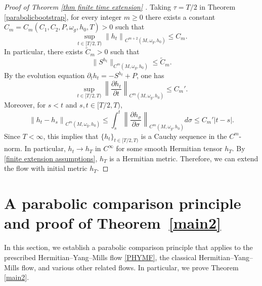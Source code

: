 \documentclass[12pt, reqno]{amsart}
\theoremstyle{plain}
\theoremstyle{definition}
\newcommand{\bproof}{\begin{proof}}
\newcommand{\eproof}{\end{proof}}
\newcommand{\p}{\partial}
\newcommand{\beq}{\begin{equation}}
\newcommand{\eeq}{\end{equation}}
\renewcommand{\tilde}{\widetilde}
\renewcommand{\>}{\rightarrow}
\renewcommand{\>}{\rightarrow}
\renewcommand{\p}{{\partial}}
\renewcommand{\tilde}{\widetilde}
\numberwithin{equation}{section} %
\begin{document}
\bproof[Proof of Theorem \ref{thm finite time extension} ]
Taking $\tau=T/2$ in Theorem \ref{parabolicbootstrap}, for every integer $m\geq0$ there exists a constant $C_m=C_m(C_1, C_2,  P, \omega_g, h_0, T)>0$ such that
\beq
\sup_{t\in[T/2,T)}\left\|h_t\right\|_{C^{m+2}(M,\omega_g, h_0)}\leq C_m.
\label{finite extension spatial estimates}
\eeq
In particular, there exists $\tilde C_m>0$ such that
\beq \|S^{h_t}\|_{C^{m}(M,\omega_g, h_0)}\leq \tilde C_m.\eeq
By the evolution equation $\partial_t h_t = -S^{h_t} + P$, one has
\beq
\sup_{t\in[T/2,T)}\left\|\frac{\p h_t}{\p t}\right\|_{C^m(M,\omega_g, h_0)}\leq C_m'.
\eeq
Moreover, for $s<t$ and $s,t\in[T/2,T)$,
\beq
\left\|h_t-h_s\right\|_{C^m(M,\omega_g, h_0)}
\leq\int_s^t\left\|\frac{\p h_\sigma}{\p\sigma}\right\|_{C^m(M,\omega_g, h_0)}d\sigma
\leq C_m'|t-s|.
\eeq
Since $T<\infty$, this implies that $\{h_t\}_{t\in[T/2,T)}$ is a Cauchy sequence in the $C^m$-norm. In particular,  $h_t\to h_T$ in $C^\infty$ for some smooth Hermitian tensor $h_T$.  By \eqref{finite extension assumptions}, $h_T$ is a Hermitian metric. Therefore, we can extend the flow with initial metric $h_T$.
\eproof


\baselineskip

    \section{A parabolic comparison principle and proof of Theorem~\ref{main2}}
In this section, we establish a parabolic comparison principle that applies to the prescribed Hermitian--Yang--Mills flow \eqref{PHYMF}, the classical Hermitian--Yang--Mills flow, and various other related flows. In particular, we prove Theorem \ref{main2}.
\end{document}
